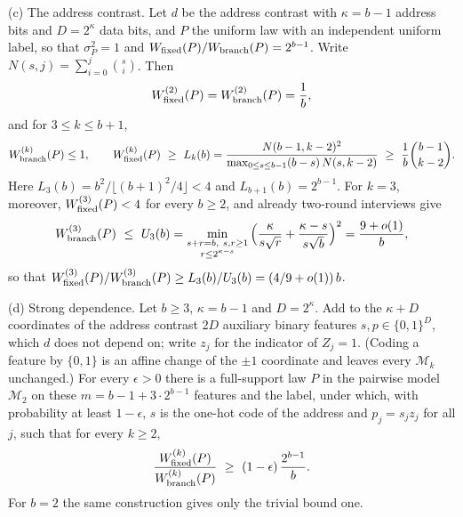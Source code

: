 \begin{theorem}
\textup{(c) The address contrast.} Let $d$ be the address contrast with
$\kappa=b-1$ address bits and $D=2^\kappa$ data bits, and $P$ the uniform law
with an independent uniform label, so that $\sigma_P^2=1$ and
$W_{\rm fixed}(P)/W_{\rm branch}(P)=2^{b-1}$. Write
$N(s,j)=\sum_{i=0}^{j}\binom si$. Then
\[
 W^{(2)}_{\rm fixed}(P)=W^{(2)}_{\rm branch}(P)=\frac1b,
\]
and for $3\le k\le b+1$,
\[
 W^{(k)}_{\rm branch}(P)\le1,\qquad
 W^{(k)}_{\rm fixed}(P)\ \ge\ L_k(b)=\frac{N(b-1,k-2)^2}{\max_{0\le s\le b-1}(b-s)\,N(s,k-2)}\ \ge\ \frac1b\binom{b-1}{k-2}.
\]
Here $L_3(b)=b^2/\lfloor(b+1)^2/4\rfloor<4$ and $L_{b+1}(b)=2^{b-1}$. For
$k=3$, moreover, $W^{(3)}_{\rm fixed}(P)<4$ for every $b\ge2$, and already
two-round interviews give
\[
 W^{(3)}_{\rm branch}(P)\ \le\ U_3(b)=\min_{\substack{s+r=b,\ s,r\ge1\\ r\le2^{\kappa-s}}}
   \Big(\frac{\kappa}{s\sqrt r}+\frac{\kappa-s}{s\sqrt b}\Big)^2=\frac{9+o(1)}{b},
\]
so that $W^{(3)}_{\rm fixed}(P)/W^{(3)}_{\rm branch}(P)\ge L_3(b)/U_3(b)=(4/9+o(1))\,b$.

\textup{(d) Strong dependence.} Let $b\ge3$, $\kappa=b-1$ and $D=2^\kappa$.
Add to the $\kappa+D$ coordinates of the address contrast $2D$ auxiliary
binary features $s,p\in\{0,1\}^D$, which $d$ does not depend on; write $z_j$
for the indicator of $Z_j=1$. (Coding a feature by $\{0,1\}$ is an affine
change of the $\pm1$ coordinate and leaves every $\mathcal M_k$ unchanged.)
For every $\epsilon>0$ there is a full-support law $P$ in the pairwise model
$\mathcal M_2$ on these $m=b-1+3\cdot2^{b-1}$ features and the label, under
which, with probability at least $1-\epsilon$, $s$ is the one-hot code of the
address and $p_j=s_jz_j$ for all $j$, such that for every $k\ge2$,
\[
 \frac{W^{(k)}_{\rm fixed}(P)}{W^{(k)}_{\rm branch}(P)}\ \ge\ (1-\epsilon)\,\frac{2^{b-1}}{b}.
\]
For $b=2$ the same construction gives only the trivial bound one.
\end{theorem}

